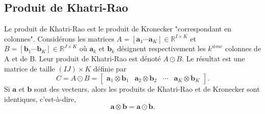 \documentclass[11pt,a4paper,oneside]{book}
\newcommand{\mbf}[1]{\mathbf{#1}}
\begin{document}
\subsection{Produit de Khatri-Rao}
Le produit de Khatri-Rao est le produit de Kronecker "correspondant en colonnes". Considérons les matrices  $A=[\mathbf{a}_1\cdots\mathbf{a}_K]\in \mathbb{R}^{I\times{K}}$ et $B=[\mathbf{b}_1\cdots\mathbf{b}_K]\in \mathbb{R}^{J\times{K}}$ où $\mathbf{a}_k$ et $\mathbf{b}_k$ désignent respectivement les $k^{ième}$ colonnes de A et de B. Leur produit de Khatri-Rao est dénoté $ A\odot B $. Le résultat est une matrice de taille $ (IJ)\times K $ définie par  
\begin{equation}
\label{tensProdKR}
C=A\odot{B}=\begin{bmatrix}
\mbf{a}_{1}\otimes\mbf{b}_{1}&\mbf{a}_{2}\otimes\mbf{b}_{2}&\cdots&\mbf{a}_{K}\otimes\mbf{b}_{K}
\end{bmatrix}.
\end{equation}
Si $ \mbf{a} $ et $\mbf{b}  $ sont des vecteurs, alors les produits de Khatri-Rao et de Kronecker  sont identiques, c'est-à-dire,\begin{equation}
\mbf{a}\otimes\mbf{b}=\mbf{a}\odot\mbf{b}.
\end{equation}  
\end{document}
